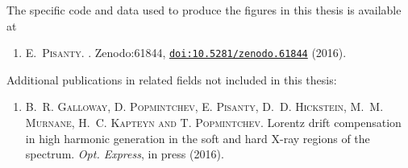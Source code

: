 \pagebreak

\noindent
The specific code and data used to produce the figures in this thesis is available at
\begin{enumerate}
\item[{\hypersetup{citecolor=black}\cite{FigureMakerThesis}}]
\textsc{E.~Pisanty}.
.
\newblock Zenodo:61844,
  \href{http://dx.doi.org/10.5281/zenodo.61844}{\texttt{doi:10.5281/zenodo.61844}}
  (2016).
\end{enumerate}



\noindent
Additional publications in related fields not included in this thesis:

\begin{enumerate}
\item[{\hypersetup{citecolor=black}\cite{galloway_lorentz_2016}}]
\textsc{B.~R. Galloway, D. Popmintchev, E. Pisanty, D.~D. Hickstein, M.~M. Murnane, H.~C. Kapteyn and T. Popmintchev}.
\newblock Lorentz drift compensation in high harmonic generation in the soft
  and hard {X}-ray regions of the spectrum.
  \emph{Opt. Express}, in press (2016).
\end{enumerate}










